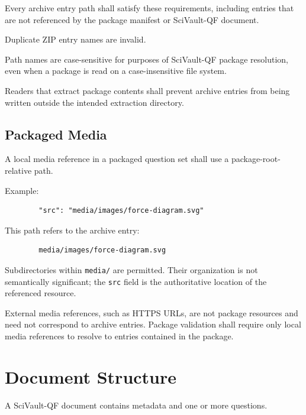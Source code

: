 \documentclass[11pt]{article}
\begin{document}
	Every archive entry path shall satisfy these requirements, including entries
	that are not referenced by the package manifest or SciVault-QF document.
	
	Duplicate ZIP entry names are invalid.
	
	Path names are case-sensitive for purposes of SciVault-QF package
	resolution, even when a package is read on a case-insensitive file system.
	
	Readers that extract package contents shall prevent archive entries from
	being written outside the intended extraction directory.
	
	\subsection{Packaged Media}
	
	A local media reference in a packaged question set shall use a
	package-root-relative path.
	
	Example:
	
	\begin{lstlisting}
		"src": "media/images/force-diagram.svg"
	\end{lstlisting}
	
	This path refers to the archive entry:
	
	\begin{lstlisting}
		media/images/force-diagram.svg
	\end{lstlisting}
	
	Subdirectories within \texttt{media/} are permitted. Their organization is
	not semantically significant; the \texttt{src} field is the authoritative
	location of the referenced resource.
	
	External media references, such as HTTPS URLs, are not package resources
	and need not correspond to archive entries. Package validation shall require
	only local media references to resolve to entries contained in the package.
	
	
	\section{Document Structure}
	
	A SciVault-QF document contains metadata and one or more questions.
	
\end{document}
